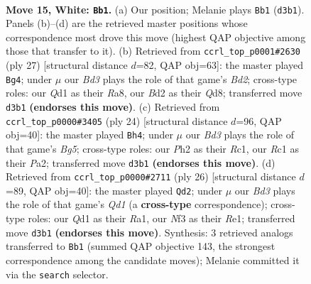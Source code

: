 \documentclass[11pt]{article}
\begin{document}
\clearpage

\begin{figure}[p]\centering
\begin{subfigure}{0.46\textwidth}\centering
\resizebox{\linewidth}{!}{%
\newchessgame
\chessboard[
  setfen={rn2r1k1/ppqbbppp/4pn2/2Pp4/N2P4/3B1N2/PP1B1PPP/2RQR1K1 w - - 15 15},
  showmover=false,
  pgfstyle=straightmove, color=movearrow, markmove={d3-b1}
]}
\caption{}
\end{subfigure}\hfill
\begin{subfigure}{0.46\textwidth}\centering
\resizebox{\linewidth}{!}{%
\newchessgame
\chessboard[
  setfen={r2qr1k1/1p1b1pbp/p2p1np1/n1pP4/P3P3/R4NP1/1PQB1PBP/1N2R1K1 b - - 2 14},
  showmover=false,
  pgfstyle=straightmove, color=movearrow, markmove={d7-g4}
]}
\caption{}
\end{subfigure}
\\[4pt]
\begin{subfigure}{0.46\textwidth}\centering
\resizebox{\linewidth}{!}{%
\newchessgame
\chessboard[
  setfen={r3k2r/1bqnbppp/pp1ppn2/6B1/2P5/2N1PN2/PPQ1BPPP/2RR2K1 w kq - 4 13},
  showmover=false,
  pgfstyle=straightmove, color=movearrow, markmove={g5-h4}
]}
\caption{}
\end{subfigure}\hfill
\begin{subfigure}{0.46\textwidth}\centering
\resizebox{\linewidth}{!}{%
\newchessgame
\chessboard[
  setfen={r1b1r1k1/ppqn1pbp/2pp1np1/8/P1BBP3/2N2N1P/1PP2PP1/R2QR1K1 w - - 3 14},
  showmover=false,
  pgfstyle=straightmove, color=movearrow, markmove={d1-d2}
]}
\caption{}
\end{subfigure}
\caption{\textbf{Move 15, White: \texttt{Bb1}.} (a) Our position; Melanie plays \texttt{Bb1} (\texttt{d3b1}). Panels (b)--(d) are the retrieved master positions whose correspondence most drove this move (highest QAP objective among those that transfer to it). (b) Retrieved from \texttt{ccrl\_top\_p0001\#2630} (ply 27) [structural distance $d$=82, QAP obj=63]: the master played \texttt{Bg4}; under $\mu$ our \emph{Bd3} plays the role of that game's \emph{Bd2}; cross-type roles: our \emph{Q}d1 as their \emph{R}a8, our \emph{B}d2 as their \emph{Q}d8; transferred move \texttt{d3b1} \textbf{(endorses this move)}. (c) Retrieved from \texttt{ccrl\_top\_p0000\#3405} (ply 24) [structural distance $d$=96, QAP obj=40]: the master played \texttt{Bh4}; under $\mu$ our \emph{Bd3} plays the role of that game's \emph{Bg5}; cross-type roles: our \emph{P}h2 as their \emph{R}c1, our \emph{R}c1 as their \emph{P}a2; transferred move \texttt{d3b1} \textbf{(endorses this move)}. (d) Retrieved from \texttt{ccrl\_top\_p0000\#2711} (ply 26) [structural distance $d$=89, QAP obj=40]: the master played \texttt{Qd2}; under $\mu$ our \emph{Bd3} plays the role of that game's \emph{Qd1} (a \textbf{cross-type} correspondence); cross-type roles: our \emph{Q}d1 as their \emph{R}a1, our \emph{N}f3 as their \emph{R}e1; transferred move \texttt{d3b1} \textbf{(endorses this move)}. Synthesis: 3 retrieved analogs transferred to \texttt{Bb1} (summed QAP objective 143, the strongest correspondence among the candidate moves); Melanie committed it via the \texttt{search} selector.}
\label{fig:thought-m28}
\end{figure}
\end{document}
